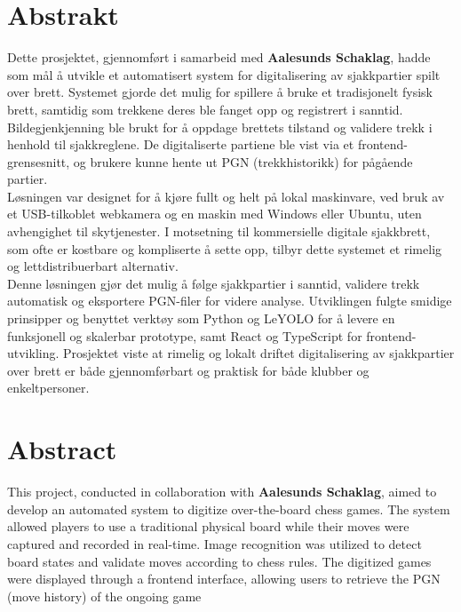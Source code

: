 \chapter*{Abstrakt}

Dette prosjektet, gjennomført i samarbeid med \textbf{Aalesunds Schaklag}, hadde som mål å utvikle et automatisert system for digitalisering av sjakkpartier spilt over brett. Systemet gjorde det mulig for spillere å bruke et tradisjonelt fysisk brett, samtidig som trekkene deres ble fanget opp og registrert i sanntid. Bildegjenkjenning ble brukt for å oppdage brettets tilstand og validere trekk i henhold til sjakkreglene. De digitaliserte partiene ble vist via et frontend-grensesnitt, og brukere kunne hente ut PGN (trekkhistorikk) for pågående partier. \\

Løsningen var designet for å kjøre fullt og helt på lokal maskinvare, ved bruk av et USB-tilkoblet webkamera og en maskin med Windows eller Ubuntu, uten avhengighet til skytjenester. I motsetning til kommersielle digitale sjakkbrett, som ofte er kostbare og kompliserte å sette opp, tilbyr dette systemet et rimelig og lettdistribuerbart alternativ. \\

Denne løsningen gjør det mulig å følge sjakkpartier i sanntid, validere trekk automatisk og eksportere PGN-filer for videre analyse. Utviklingen fulgte smidige prinsipper og benyttet verktøy som Python og LeYOLO for å levere en funksjonell og skalerbar prototype, samt React og TypeScript for frontend-utvikling. Prosjektet viste at rimelig og lokalt driftet digitalisering av sjakkpartier over brett er både gjennomførbart og praktisk for både klubber og enkeltpersoner.

\chapter*{Abstract}
This project, conducted in collaboration with \textbf{Aalesunds Schaklag}, aimed to develop an automated system to digitize over-the-board chess games. The system allowed players to use a traditional physical board while their moves were captured and recorded in real-time. Image recognition was utilized to detect board states and validate moves according to chess rules. The digitized games were displayed through a frontend interface, allowing users to retrieve the PGN (move history) of the ongoing game \\

